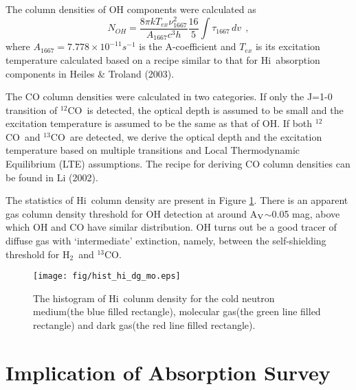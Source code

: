\documentclass[preprint]{emulateapj}
\def\hi{H{\sc i}}
\def\co{$^{12}$CO}
\def\13co{$^{13}$CO}
\def\h2{H$_2$}
\def\lc{\>\> ,}
\begin{document}
The column densities of  OH components were calculated as
\begin{equation}
N_{OH}=\frac{8\pi kT_{ex}{{\nu}^2_{1667}}}{A_{1667}c^{3}h}\frac{16}{5}\int \tau_{1667} \,dv \lc
\label{eq5}
\end{equation}
where $A_{1667}=7.778\times 10^{-11} s^{-1}$ is the A-coefficient  and $T_{ex}$ is its excitation temperature calculated based on a
recipe similar to that for \hi\ absorption components in Heiles \& Troland (2003). 

The CO column densities were calculated in two categories. If only the J=1-0 transition of \co\ is detected, the optical depth is assumed to be small and the excitation temperature is assumed to be the same as that of OH. If both \co\ and \13co\ are detected, we derive the optical depth and the excitation temperature based on multiple transitions and Local Thermodynamic Equilibrium (LTE) assumptions. The recipe for deriving CO column densities can be found in Li (2002).

The statistics of \hi\ column density are present in Figure \ref{fig:hist_hi_dg_mo}.  There is an apparent gas column density threshold for OH detection at around A$\rm_V$$\sim$0.05 mag, above which OH and CO have similar distribution.
OH turns out be a good tracer of diffuse gas with `intermediate' extinction, namely, between the self-shielding threshold for \h2\ and \13co.
\begin{figure}
\texttt{[image: fig/hist\_hi\_dg\_mo.eps]}
\caption{The histogram of \hi\ colunm density for the cold neutron medium(the blue filled rectangle), molecular gas(the green line filled rectangle) and dark gas(the red line filled rectangle).  }
\label{fig:hist_hi_dg_mo}
\end{figure}

\section{Implication of Absorption Survey}
\label{sec:abs_survey}
\end{document}
